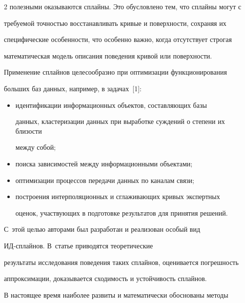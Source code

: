 \begin{multicols}{2}
полезными оказываются сплайны. Это обусловлено тем, что сплайны могут с 


требуемой точностью восстанавливать кривые и поверхности, сохраняя их 


специфические особенности, что особенно важно, когда отсутствует строгая 


математическая модель описания поведения кривой или поверхности. 


  


  Применение сплайнов целесообразно при оптимизации функционирования 


больших баз данных, например, в задачах~[1]:\\[-14pt] 


  \begin{itemize}


  \item идентификации информационных объектов, составляющих базы 


данных, кластеризации данных при выработке суждений о степени их близости 


между собой;\\[-14pt] 


  \item поиска зависимостей между информационными объектами;


  \item оптимизации процессов передачи данных по каналам связи;


  \item построения интерполяционных и сгла\-жи\-ва\-ющих кривых экспертных 


оценок, участ\-ву\-ющих в подготовке результатов для принятия решений.


  \end{itemize}


  


  С~этой целью авторами был разработан и реализован особый вид 


ИД-сплайнов. В~статье приводятся теоретические 


результаты исследования поведения таких сплайнов, оценивается погрешность 


аппроксимации, доказывается сходимость и устойчивость сплайнов.


  


  В настоящее время наиболее развиты и математически обоснованы методы 



\end{multicols}
